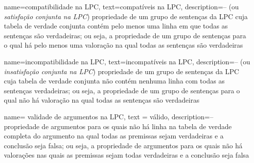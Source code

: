 {
  name=compatibilidade na LPC,
  text=compatíveis na LPC,
description={-- (ou \textit{satisfação conjunta na LPC}) propriedade de um grupo de sentenças da LPC cuja tabela de verdade conjunta contém pelo menos uma linha em que todas as sentenças são verdadeiras; ou seja, a propriedade de um grupo de sentenças para o qual há pelo menos uma valoração na qual todas as sentenças são verdadeiras}
}

{
  name=incompatibilidade na LPC,
  text=incompatíveis na LPC,
description={-- (ou \textit{insatisfação conjunta na LPC}) propriedade de um grupo de sentenças da LPC cuja tabela de verdade conjunta não contém nenhuma linha com todas as sentenças verdadeiras; ou seja, a propriedade de um grupo de sentenças para o qual não há valoração na qual todas as sentenças são verdadeiras}
}

{
name= validade de argumentos na LPC,
text = válido,
description={-- propriedade de argumentos para os quais não há linha na tabela de verdade completa do argumento na qual todas as premissas sejam verdadeiras e a conclusão seja falsa; ou seja, a propriedade de argumentos para os quais não há valorações nas quais as premissas sejam todas verdadeiras e a conclusão seja falsa}
}







